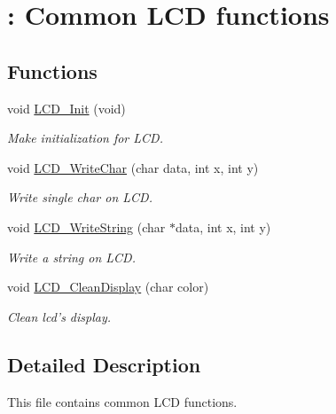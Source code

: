 \hypertarget{group___l_c_d}{\section{\+: Common L\+C\+D functions}
\label{group___l_c_d}
}
\subsection*{Functions}
\begin{DoxyCompactItemize}
\item 
void \hyperlink{group___l_c_d_gaa53c9d40f3aa552a9974cd55ac510cb3}{L\+C\+D\+\_\+\+Init} (void)
\begin{DoxyCompactList}\small\item\em Make initialization for L\+C\+D. \end{DoxyCompactList}\item 
void \hyperlink{group___l_c_d_gac0435a3588dc5439ac35ac431d5d4381}{L\+C\+D\+\_\+\+Write\+Char} (char data, int x, int y)
\begin{DoxyCompactList}\small\item\em Write single char on L\+C\+D. \end{DoxyCompactList}\item 
void \hyperlink{group___l_c_d_ga07305051b18e7f4d4df9119cbbc9536c}{L\+C\+D\+\_\+\+Write\+String} (char $\ast$data, int x, int y)
\begin{DoxyCompactList}\small\item\em Write a string on L\+C\+D. \end{DoxyCompactList}\item 
void \hyperlink{group___l_c_d_gafe28b20cf856511f4047a053ba2b5b99}{L\+C\+D\+\_\+\+Clean\+Display} (char color)
\begin{DoxyCompactList}\small\item\em Clean lcd's display. \end{DoxyCompactList}\end{DoxyCompactItemize}


\subsection{Detailed Description}
This file contains common L\+C\+D functions. 

